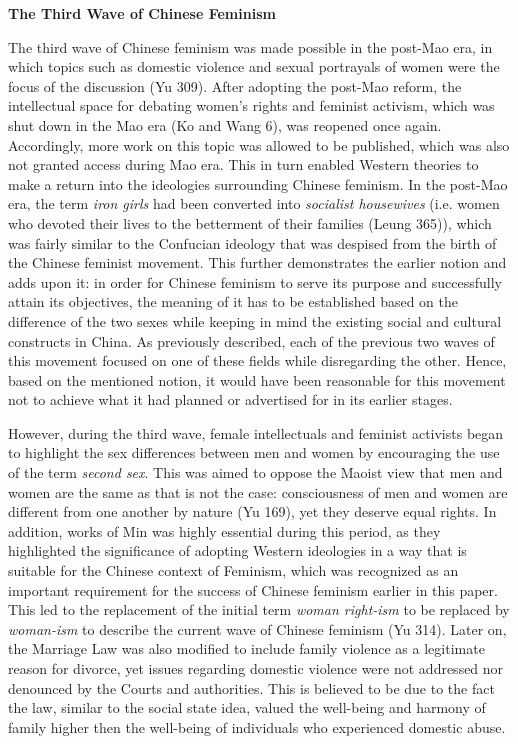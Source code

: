 \documentclass[12pt]{article}
\begin{document}
\begin{flushleft}
		\vspace{0.3cm}
		\noindent \textbf{The Third Wave of Chinese Feminism}
		
		\noindent 
		The third wave of Chinese feminism was made possible in the post-Mao era, in which topics such as domestic violence and sexual portrayals of women were the focus of the discussion (Yu 309). After adopting the post-Mao reform, the intellectual space for debating women’s rights and feminist activism, which was shut down in the Mao era (Ko and Wang 6), was reopened once again. Accordingly, more work on this topic was allowed to be published, which was also not granted access during Mao era. This in turn enabled Western theories to make a return into the ideologies surrounding Chinese feminism. In the post-Mao era, the term \textit{iron girls} had been converted into \textit{socialist housewives }(i.e. women who devoted their lives to the betterment of their families (Leung 365)), which was fairly similar to the Confucian ideology that was despised from the birth of the Chinese feminist movement. This further demonstrates the earlier notion and adds upon it: in order for Chinese feminism to serve its purpose and successfully attain its objectives, the meaning of it has to be established based on the difference of the two sexes while keeping in mind the existing social and cultural constructs in China. As previously described, each of the previous two waves of this movement focused on one of these fields while disregarding the other. Hence, based on the mentioned notion, it would have been reasonable for this movement not to achieve what it had planned or advertised for in its earlier stages. 
		
		However, during the third wave, female intellectuals and feminist activists began to highlight the sex differences between men and women by encouraging the use of the term \textit{second sex}. This was aimed to oppose the Maoist view that men and women are the same as that is not the case: consciousness of men and women are different from one another by nature (Yu 169), yet they deserve equal rights. In addition, works of Min was highly essential during this period, as they highlighted the significance of adopting Western ideologies in a way that is suitable for the Chinese context of Feminism, which was recognized as an important requirement for the success of Chinese feminism earlier in this paper. This led to the replacement of the initial term \textit{woman right-ism} to be replaced by \textit{woman-ism} to describe the current wave of Chinese feminism (Yu 314). Later on, the Marriage Law was also modified to include family violence as a legitimate reason for divorce, yet issues regarding domestic violence were not addressed nor denounced by the Courts and authorities. This is believed to be due to the fact the law, similar to the social state idea, valued the well-being and harmony of family higher then the well-being of individuals who experienced domestic abuse. 
		

\end{flushleft}
\end{document}

